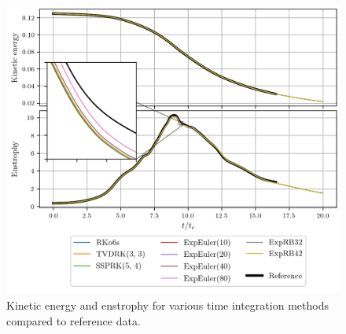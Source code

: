       \begin{figure}
        \centering
        \includegraphics{figures/tgv_curves.png}
        \caption{Kinetic energy and enstrophy for various time integration methods compared to reference data.}
        \label{fig:tgv_curves}
      \end{figure}

